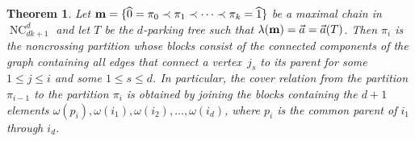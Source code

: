 \documentclass[11pt]{amsart}
\newtheorem{theorem}{Theorem}[section]
\numberwithin{equation}{section}
\newcommand{\hz}{\widehat{0}}
\newcommand{\ho}{\widehat{1}}
\newcommand{\coveredby}{\prec}
\DeclareMathOperator{\NC}{NC}
\begin{document}
\begin{theorem}
Let ${\bf m} = \{\hz = \pi_{0} \coveredby \pi_{1} \coveredby \cdots \coveredby \pi_{k} = \ho\}$
be a maximal chain in $\NC^{d}_{dk+1}$
and let $T$ be the $d$-parking tree such that $\lambda({\bf m}) = \vec{a} = \vec{a}(T)$. 
Then $\pi_{i}$ is the noncrossing partition whose blocks consist of the connected
components of the graph containing all edges that connect a vertex~$j_{s}$
to its parent for some $1 \leq j \leq i$ and some $1 \leq s \leq d$.
In particular, the cover relation from the partition $\pi_{i-1}$ to the
partition $\pi_{i}$ is obtained by joining the blocks containing the $d+1$ elements
$\omega(p_{i}), \omega(i_{1}), \omega(i_{2}), \ldots, \omega(i_{d})$, where
$p_{i}$ is the common parent of $i_{1}$ through $i_{d}$. 
\label{theorem_parking_noncrossing}
\end{theorem}
\end{document}
